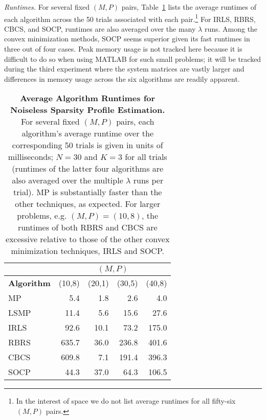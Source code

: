 \documentclass[final]{siamltex}
\begin{document}
   {\em{Runtimes}.} For several fixed $(M,P)$ pairs,
   Table~\ref{tab:r1} lists the average runtimes of each algorithm
   across the 50 trials associated with each pair.\footnote{In the
   interest of space we do not list average runtimes for all fifty-six
   $(M,P)$ pairs.}  For IRLS, RBRS, CBCS, and SOCP, runtimes are also
   averaged over the many $\lambda$ runs.  Among the convex
   minimization methods, SOCP seems superior given its fast runtimes
   in three out of four cases.  Peak memory usage is not tracked here
   because it is difficult to do so when using MATLAB for such small
   problems; it will be tracked during the third experiment where the
   system matrices are vastly larger and differences in memory usage
   across the six algorithms are readily apparent.
   \begin{table}
   \begin{center}
   \small
   \begin{tabular}{|l|r|r|r|r|}
   \hline
                          & \multicolumn{4}{c|}{$(M,P)$} \\ \hline
       {\bf{Algorithm}}     & (10,8) & (20,1) & (30,5) & (40,8) \\ \hline
    MP                    & 5.4      & 1.8     & 2.6  & 4.0  \\
    LSMP                  & 11.4     & 5.6     & 15.6 & 27.6 \\
    IRLS  & 92.6     & 10.1    & 73.2  & 175.0 \\
    RBRS  & 635.7    & 36.0    & 236.8 & 401.6 \\
    CBCS  & 609.8    & 7.1     & 191.4 & 396.3 \\
    SOCP  & 44.3     & 37.0    & 64.3  & 106.5 \\ \hline
   \end{tabular}
   \end{center}

   \caption{{\bf{Average Algorithm Runtimes for Noiseless Sparsity
   Profile Estimation.}} For several fixed $(M,P)$ pairs, each
   algorithm's average runtime over the corresponding 50 trials is
   given in units of milliseconds; $N=30$ and $K=3$ for all trials
   (runtimes of the latter four algorithms are also averaged over the
   multiple $\lambda$ runs per trial).  MP is substantially faster
   than the other techniques, as expected.  For larger problems,
   e.g. $(M,P)=(10,8)$, the runtimes of both RBRS and CBCS are
   excessive relative to those of the other convex minimization
   techniques, IRLS and SOCP\@.}  \label{tab:r1}

   \end{table}
\end{document}
